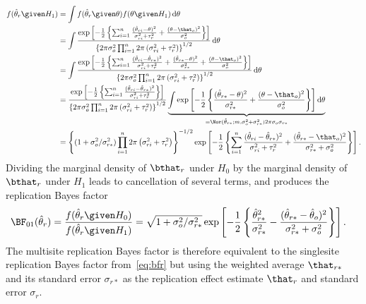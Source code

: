 \begin{subappendices}
\begin{align*}
        f(\hat{\theta}_{r} \given H_{1})
        &= \int f(\hat{\theta}_{r} \given \theta) f(\theta \given H_{1})
                        \, \text{d}\theta \\
              &= \int \frac{\exp\left[-\frac{1}{2} \left\{\sum_{i=1}^{n} \frac{(\hat{\theta}_{ri} - \theta)^{2}}{\sigma^{2}_{ri} + \tau^{2}_{r}} +
                  \frac{(\theta - \that_{o})^{2}}{\sigma^{2}_{o}}\right\} \right]}{
                                    \left\{2\pi \sigma^{2}_{o} \prod_{i = 1}^{n} 2\pi \left(\sigma^{2}_{ri} + \tau^{2}_{r}\right)\right\}^{1/2}}
    \, \text{d}\theta \\
  &= \int \frac{
    \exp\left[-\frac{1}{2} \left\{\sum_{i=1}^{n} \frac{(\hat{\theta}_{ri} - \hat{\theta}_{r*})^{2}}{\sigma^{2}_{ri} + \tau^{2}_{r}} +  \frac{(\hat{\theta}_{r*} - \theta)^{2}}{\sigma^{2}_{r*}} +
    \frac{(\theta - \that_{o})^{2}}{\sigma^{2}_{o}}\right\} \right]}{
    \left\{2\pi \sigma^{2}_{o} \prod_{i = 1}^{n} 2\pi \left(\sigma^{2}_{ri} + \tau^{2}_{r}\right)\right\}^{1/2}}
    \, \text{d}\theta \\
  &= \frac{\exp\left[-\frac{1}{2} \left\{\sum_{i=1}^{n} \frac{(\hat{\theta}_{ri} - \hat{\theta}_{r*})^{2}}{\sigma^{2}_{ri} + \tau^{2}_{r}}\right\} \right]}{\left\{2\pi \sigma^{2}_{o} \prod_{i = 1}^{n} 2\pi \left(\sigma^{2}_{ri} + \tau^{2}_{r}\right)\right\}^{1/2}}
    \underbrace{\int \exp\left[-\frac{1}{2} \left\{\frac{(\hat{\theta}_{r*} - \theta)^{2}}{\sigma^{2}_{r*}} +
    \frac{(\theta - \that_{o})^{2}}{\sigma^{2}_{o}}\right\} \right] \text{d}\theta}_{= \Nor(\hat{\theta}_{r*}; m, \sigma^{2}_{o} + \sigma^{2}_{r*}) 2\pi \sigma_{o} \sigma_{r*}} \\
  &= \left\{(1 + \sigma^{2}_{o}/\sigma^{2}_{r*}) \prod_{i = 1}^{n} 2\pi \left(\sigma^{2}_{ri} + \tau^{2}_{r}\right)\right\}^{-1/2} \exp\left[-\frac{1}{2}\left\{
    \sum_{i=1}^{n} \frac{(\hat{\theta}_{ri} - \hat{\theta}_{r*})^{2}}{\sigma^{2}_{ri} + \tau^{2}_{r}} + \frac{(\hat{\theta}_{r*} - \that_{o})^{2}}{\sigma^{2}_{r*} + \sigma^{2}_{o}}\right\}\right].
\end{align*}
Dividing the marginal density of $\bthat_{r}$ under $H_{0}$ by the marginal
density of $\bthat_{r}$ under $H_{1}$ leads to cancellation of several terms, and
produces the replication Bayes factor
\begin{align*}
  \BF_{01}(\hat{\theta}_{r})
  &= \frac{f(\hat{\theta}_{r} \given H_{0})}{f(\hat{\theta}_{r} \given H_{1})}
    = \sqrt{1 + \sigma^{2}_{o}/\sigma^{2}_{r*}}  \exp\left[-\frac{1}{2}\left\{
    \frac{\hat{\theta}_{r*}^{2}}{\sigma^{2}_{r*}} -
    \frac{(\hat{\theta}_{r*} - \hat{\theta}_{o})^{2}}{\sigma^{2}_{r*} + \sigma^{2}_{o}}\right\}\right].
\end{align*}
The multisite replication Bayes factor is therefore equivalent to the singlesite
replication Bayes factor from~\eqref{eq:bfr} but using the weighted average
$\that_{r*}$ and its standard error $\sigma_{r*}$ as the replication effect
estimate $\that_{r}$ and standard error $\sigma_{r}$.


\end{subappendices}
